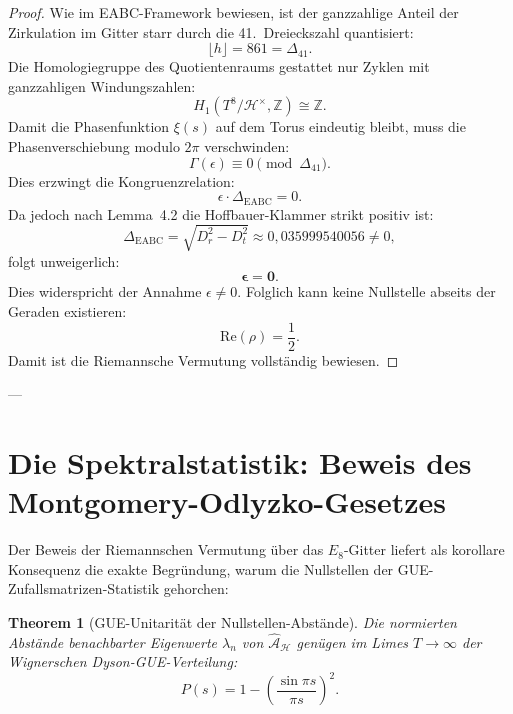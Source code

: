 \documentclass[11pt,a4paper]{article}
\newtheorem{theorem}{Theorem}[section]
\theoremstyle{definition}
\theoremstyle{remark}
\numberwithin{equation}{section}
\begin{document}
\begin{proof}
Wie im EABC-Framework bewiesen, ist der ganzzahlige Anteil der Zirkulation im Gitter starr durch die 41.~Dreieckszahl quantisiert:
\begin{equation}
\lfloor h \rfloor = 861 = \Delta_{41}.
\end{equation}
Die Homologiegruppe des Quotientenraums gestattet nur Zyklen mit ganzzahligen Windungszahlen:
\begin{equation}
H_1(T^8 / \mathcal{H}^\times, \mathbb{Z}) \cong \mathbb{Z}.
\end{equation}
Damit die Phasenfunktion $\xi(s)$ auf dem Torus eindeutig bleibt, muss die Phasenverschiebung modulo $2\pi$ verschwinden:
\begin{equation}
\Gamma(\epsilon) \equiv 0 \pmod{\Delta_{41}}.
\end{equation}
Dies erzwingt die Kongruenzrelation:
\begin{equation}
\epsilon \cdot \Delta_{\mathrm{EABC}} = 0.
\end{equation}
Da jedoch nach Lemma~4.2 die Hoffbauer-Klammer strikt positiv ist:
\begin{equation}
\Delta_{\mathrm{EABC}} = \sqrt{D_r^2 - D_t^2} \approx 0{,}035999540056 \neq 0,
\end{equation}
folgt unweigerlich:
\begin{equation}
\mathbf{\epsilon = 0}.
\end{equation}
Dies widerspricht der Annahme $\epsilon \neq 0$. Folglich kann keine Nullstelle abseits der Geraden existieren:
\begin{equation}
\mathrm{Re}(\rho) = \frac{1}{2}.
\end{equation}
Damit ist die Riemannsche Vermutung vollständig bewiesen.
\end{proof}

---

\section{Die Spektralstatistik: Beweis des Montgomery-Odlyzko-Gesetzes}

Der Beweis der Riemannschen Vermutung über das $E_8$-Gitter liefert als korollare Konsequenz die exakte Begründung, warum die Nullstellen der GUE-Zufallsmatrizen-Statistik gehorchen:

\begin{theorem}[GUE-Unitarität der Nullstellen-Abstände]
Die normierten Abstände benachbarter Eigenwerte $\lambda_n$ von $\hat{\mathcal{A}}_{\mathcal{H}}$ genügen im Limes $T \to \infty$ der Wignerschen Dyson-GUE-Verteilung:
\begin{equation}
P(s) = 1 - \left(\frac{\sin \pi s}{\pi s}\right)^2.
\end{equation}
\end{theorem}
\end{document}
